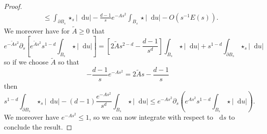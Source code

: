 \documentclass[reqno,12pt,letterpaper]{amsart}
\newcommand*\dif{\mathop{}\!\mathrm{d}}
\theoremstyle{definition}
\numberwithin{equation}{section}
\begin{document}
\begin{proof}
\begin{align*}
&\leq \int_{\partial B_s} \star_s |\dif u| - \frac{d - 1}{s} e^{-As^2} \int_{B_s} \star |\dif u| - O(s^{-1}E(s)).
\end{align*}
We moreover have for $\tilde A \geq 0$ that
$$e^{-\tilde As^2} \partial_s \left[e^{\tilde As^2} s^{1 - d} \int_{B_s} \star |\dif u|\right] = \left[2\tilde As^{2 - d} - \frac{d - 1}{s^d}\right]\int_{B_s} \star |\dif u| + s^{1 - d} \int_{\partial B_s} \star_s |\dif u|$$
so if we choose $\tilde A$ so that
$$-\frac{d - 1}{s} e^{-As^2} = 2\tilde As - \frac{d - 1}{s}$$
then
$$s^{1 - d} \int_{\partial B_s} \star_s |\dif u| - (d - 1)\frac{e^{-As^2}}{s^d} \int_{B_s} \star|\dif u| \leq e^{-As^2} \partial_s\left(e^{As^2} s^{1 - d} \int_{B_s} \star|\dif u|\right).$$
We moreover have $e^{-As^2} \leq 1$, so we can now integrate with respect to $\dif s$ to conclude the result.
\end{proof}
\end{document}
